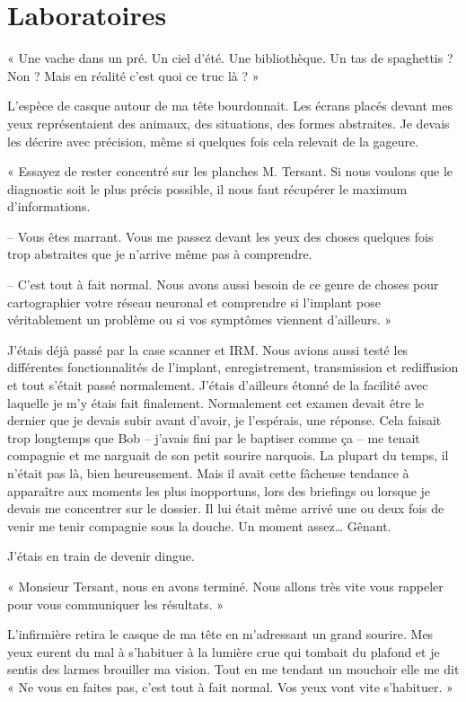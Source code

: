\chapter{Laboratoires}

« Une vache dans un pré. Un ciel d'été. Une bibliothèque. Un tas de spaghettis ? Non ? Mais en réalité c'est quoi ce
truc là ? »

L'espèce de casque autour de ma tête bourdonnait. Les écrans placés devant mes yeux représentaient des animaux, des 
situations, des formes abstraites. Je devais les décrire avec précision, même si quelques fois cela relevait de la
gageure.

« Essayez de rester concentré sur les planches M. Tersant. Si nous voulons que le diagnostic soit le plus précis
possible, il nous faut récupérer le maximum d'informations.

-- Vous êtes marrant. Vous me passez devant les yeux des choses quelques fois trop abstraites que je n'arrive même pas à
comprendre.

-- C'est tout à fait normal. Nous avons aussi besoin de ce genre de choses pour cartographier votre réseau neuronal et
comprendre si l'implant pose véritablement un problème ou si vos symptômes viennent d'ailleurs. »

J'étais déjà passé par la case scanner et IRM. Nous avions aussi testé les différentes fonctionnalités de l'implant,
enregistrement, transmission et rediffusion et tout s'était passé normalement. J'étais d'ailleurs étonné de la facilité
avec laquelle je m'y étais fait finalement. Normalement cet examen devait être le dernier que je devais subir avant 
d'avoir, je l'espérais, une réponse. Cela faisait trop longtemps que Bob -- j'avais fini par le baptiser comme ça -- me
tenait compagnie et me narguait de son petit sourire narquois. La plupart du temps, il n'était pas là, bien 
heureusement. Mais il avait cette fâcheuse tendance à apparaître aux moments les plus inopportuns, lors des briefings 
ou lorsque je devais me concentrer sur le dossier. Il lui était même arrivé une ou deux fois de venir me tenir 
compagnie sous la douche. Un moment assez… Gênant.

J'étais en train de devenir dingue.

« Monsieur Tersant, nous en avons terminé. Nous allons très vite vous rappeler pour vous communiquer les résultats. »

L'infirmière retira le casque de ma tête en m'adressant un grand sourire. Mes yeux eurent du mal à s'habituer à la
lumière crue qui tombait du plafond et je sentis des larmes brouiller ma vision. Tout en me tendant un mouchoir elle me
dit « Ne vous en faites pas, c'est tout à fait normal. Vos yeux vont vite s'habituer. »

